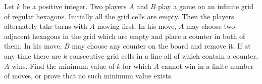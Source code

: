 Let $k$ be a positive integer. Two players $A$ and $B$ play a game on an infinite grid of regular hexagons. Initially all the grid cells are empty. Then the players alternately take turns with $A$ moving first. In his move, $A$ may choose two adjacent hexagons in the grid which are empty and place a counter in both of them. In his move, $B$ may choose any counter on the board and remove it. If at any time there are $k$ consecutive grid cells in a line all of which contain a counter, $A$ wins. Find the minimum value of $k$ for which $A$ cannot win in a finite number of moves, or prove that no such minimum value exists.